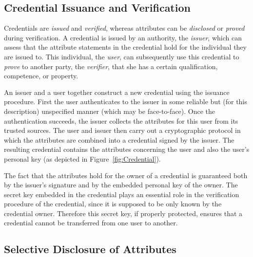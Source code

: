 
\subsection{Credential Issuance and Verification}

Credentials are \emph{issued} and \emph{verified}, whereas attributes can be
\emph{disclosed} or \emph{proved} during verification. A credential is issued
by an authority, the \emph{issuer}, which can assess that the
attribute statements in the credential hold for the
individual they are issued to. This individual, the \emph{user}, can
subsequently use this credential to \emph{prove} to another party, the
\emph{verifier}, that she has a certain qualification,
competence, or property.

An issuer and a user together construct a new credential using the issuance
procedure. First the user authenticates
 to the issuer in some reliable but (for this
description) unspecified manner (which may be face-to-face). Once the
authentication succeeds, the issuer collects the
attributes for this user from its trusted sources. The user
and issuer then carry out a cryptographic protocol in which the attributes
are combined into a credential signed by the issuer. The resulting credential
contains the attributes concerning the user and also the user's personal key (as
depicted in Figure~\ref{fig:Credential}).

The fact that the attributes hold for the owner of a
credential is guaranteed both by the issuer's signature and by the embedded
personal key of the owner. The secret key embedded in the credential plays an 
essential role in the verification procedure of 
the credential, since it is supposed to be only known by the credential owner. 
Therefore this secret key, if properly protected, ensures that a credential 
cannot be transferred from one user to another.

\subsection{Selective Disclosure of Attributes}

